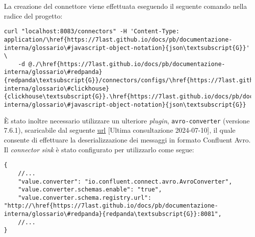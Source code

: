 La creazione del connettore viene effettuata eseguendo il seguente comando nella radice del progetto:
\begin{verbatim}
curl "localhost:8083/connectors" -H 'Content-Type: application/\href{https://7last.github.io/docs/pb/documentazione-interna/glossario\#javascript-object-notation}{json\textsubscript{G}}' \
    -d @./\href{https://7last.github.io/docs/pb/documentazione-interna/glossario\#redpanda}{redpanda\textsubscript{G}}/connectors/configs/\href{https://7last.github.io/docs/pb/documentazione-interna/glossario\#clickhouse}{clickhouse\textsubscript{G}}.\href{https://7last.github.io/docs/pb/documentazione-interna/glossario\#javascript-object-notation}{json\textsubscript{G}}
\end{verbatim}

È stato inoltre necessario utilizzare un ulteriore \textit{plugin}, \texttt{avro-converter} (versione 7.6.1), scaricabile dal seguente
\href{https://www.confluent.io/hub/confluentinc/kafka-connect-avro-converter}{\underline{url}} [Ultima consultazione 2024-07-10],
il quale consente di effettuare la deserializzazione dei messaggi in formato Confluent Avro.\\
Il \textit{connector sink} è stato configurato per utilizzarlo come segue:
\begin{lstlisting}[language=\href{https://7last.github.io/docs/pb/documentazione-interna/glossario\#javascript-object-notation}{json\textsubscript{G}}, caption=Utilizzo del \textit{plugin} \texttt{avro-converter} all'interno del file \href{https://7last.github.io/docs/pb/documentazione-interna/glossario\#clickhouse}{\texttt{clickhouse}\textsubscript{G}}\texttt{.\href{https://7last.github.io/docs/pb/documentazione-interna/glossario\#javascript-object-notation}{json\textsubscript{G}}},captionpos=b]
{
    //...
    "value.converter": "io.confluent.connect.avro.AvroConverter",
    "value.converter.schemas.enable": "true",
    "value.converter.schema.registry.url": "http://\href{https://7last.github.io/docs/pb/documentazione-interna/glossario\#redpanda}{redpanda\textsubscript{G}}:8081",
    //...
}
\end{lstlisting}

